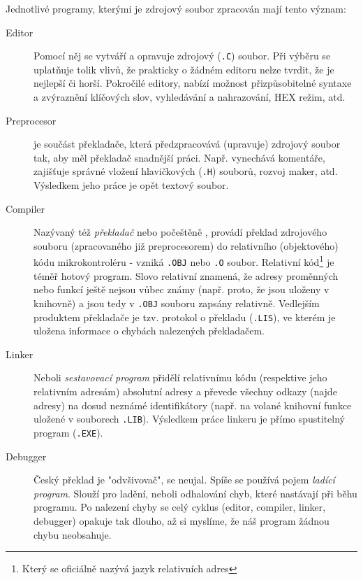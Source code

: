       Jednotlivé programy, kterými je zdrojový soubor zpracován mají tento význam:
      \begin{description}
        \item[Editor] Pomocí něj se vytváří a opravuje zdrojový (\texttt{.C}) soubor. Při výběru se 
          uplatňuje tolik vlivů, že prakticky o žádném editoru nelze tvrdit, že je nejlepší či 
          horší. Pokročilé editory, nabízí možnost přizpůsobitelné syntaxe a zvýraznění klíčových 
          slov, vyhledávání a nahrazování, HEX režim, atd.
        \item[Preprocesor] je součást překladače, která předzpracovává (upravuje) zdrojový soubor 
          tak, aby měl překladač snadnější práci. Např. vynechává komentáře, zajišťuje správné 
          vložení hlavičkových (\texttt{.H}) souborů, rozvoj maker, atd. Výsledkem jeho práce je 
          opět textový soubor.
        \item[Compiler] Nazývaný též \emph{překladač} nebo počeštěně , provádí      
          překlad zdrojového souboru (zpracovaného již preprocesorem) do relativního (objektového) 
          kódu mikrokontroléru - vzniká \texttt{.OBJ} nebo \texttt{.O} soubor. Relativní 
          kód\footnote{Který se oficiálně nazývá jazyk relativních adres} je téměř hotový program. 
          Slovo relativní znamená, že adresy proměnných nebo funkcí ještě nejsou vůbec známy (např. 
          proto, že jsou uloženy v knihovně) a jsou tedy v \texttt{.OBJ} souboru zapsány relativně. 
          Vedlejším produktem překladače je tzv. protokol o překladu (\texttt{.LIS}), ve kterém je 
          uložena informace o chybách nalezených překladačem. 
        \item[Linker] Neboli \emph{sestavovací program} přidělí relativnímu kódu (respektive jeho 
          relativním adresám) absolutní adresy a převede všechny odkazy (najde adresy) na dosud 
          neznámé identifikátory (např. na volané knihovní funkce uložené v souborech 
          \texttt{.LIB}). Výsledkem práce linkeru je přímo spustitelný program (\texttt{.EXE}). 
        \item[Debugger] Český překlad je "odvšivovač", se neujal. Spíše se používá pojem 
          \emph{ladící program}. Slouží pro ladění, neboli odhalování chyb, které nastávají při 
          běhu programu. Po nalezení chyby se celý cyklus (editor, compiler, linker, debugger) 
          opakuje tak dlouho, až si myslíme, že náš program žádnou chybu neobsahuje. 
      \end{description}
      
